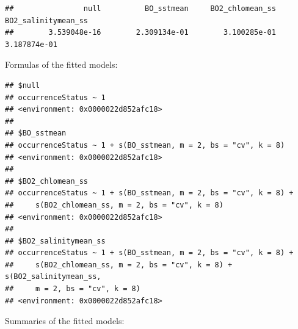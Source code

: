 \documentclass[
]{book}
\newenvironment{Shaded}{\begin{snugshade}}{\end{snugshade}}
\newcommand{\FunctionTok}[1]{\textcolor[rgb]{0.00,0.00,0.00}{#1}}
\newcommand{\NormalTok}[1]{#1}
\newcommand{\SpecialCharTok}[1]{\textcolor[rgb]{0.00,0.00,0.00}{#1}}
\begin{document}
\begin{verbatim}
##                null          BO_sstmean     BO2_chlomean_ss BO2_salinitymean_ss 
##        3.539048e-16        2.309134e-01        3.100285e-01        3.187874e-01
\end{verbatim}

Formulas of the fitted models:

\begin{Shaded}
\end{Shaded}

\begin{verbatim}
## $null
## occurrenceStatus ~ 1
## <environment: 0x0000022d852afc18>
## 
## $BO_sstmean
## occurrenceStatus ~ 1 + s(BO_sstmean, m = 2, bs = "cv", k = 8)
## <environment: 0x0000022d852afc18>
## 
## $BO2_chlomean_ss
## occurrenceStatus ~ 1 + s(BO_sstmean, m = 2, bs = "cv", k = 8) + 
##     s(BO2_chlomean_ss, m = 2, bs = "cv", k = 8)
## <environment: 0x0000022d852afc18>
## 
## $BO2_salinitymean_ss
## occurrenceStatus ~ 1 + s(BO_sstmean, m = 2, bs = "cv", k = 8) + 
##     s(BO2_chlomean_ss, m = 2, bs = "cv", k = 8) + s(BO2_salinitymean_ss, 
##     m = 2, bs = "cv", k = 8)
## <environment: 0x0000022d852afc18>
\end{verbatim}

Summaries of the fitted models:

\begin{Shaded}
\end{Shaded}
\end{document}
